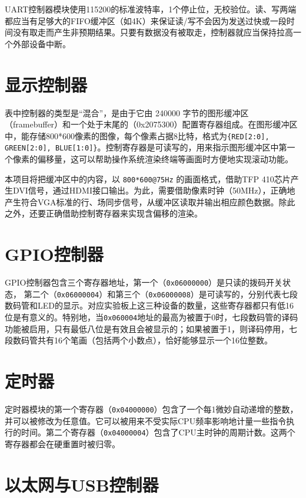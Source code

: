 UART控制器模块使用115200的标准波特率，1个停止位，无校验位。读、写两端都应当有足够大的FIFO缓冲区（如4K）来保证读/写不会因为发送过快或一段时间没有取走而产生非预期结果。只要有数据没有被取走，控制器就应当保持拉高一个外部设备中断。

\section{显示控制器}

表中控制器的类型是“混合”，是由于它由 240000 字节的图形缓冲区（framebuffer）和一个处于末尾的（0x2075300）配置寄存器组成。在图形缓冲区中，能存储800*600像素的图像，每个像素占据8比特，格式为\texttt{\{RED[2:0], GREEN[2:0], BLUE[1:0]\}}。控制寄存器是可读写的，用来指示图形缓冲区中第一个像素的偏移量，这可以帮助操作系统渲染终端等画面时方便地实现滚动功能。

本项目将把缓冲区中的内容，以 \texttt{800*600@75Hz} 的画面格式，借助TFP 410芯片产生DVI信号，通过HDMI接口输出。为此，需要借助像素时钟（50MHz），正确地产生符合VGA标准的行、场同步信号，从缓冲区读取并输出相应颜色数据。除此之外，还要正确借助控制寄存器来实现含偏移的渲染。

\section{GPIO控制器}

GPIO控制器包含三个寄存器地址，第一个（\texttt{0x06000000}）是只读的拨码开关状态， 第二个（\texttt{0x06000004}）和第三个（\texttt{0x06000008}）是可读写的，分别代表七段数码管和LED的显示。对应实验板上这三种设备的数量，这些寄存器都只有低16位是有意义的。特别地，当\texttt{0x060004}地址的最高为被置于0时，七段数码管的译码功能被启用，只有最低八位是有效且会被显示的；如果被置于1，则译码停用，七段数码管共有16个笔画（包括两个小数点），恰好能够显示一个16位整数。

\section{定时器}

定时器模块的第一个寄存器（\texttt{0x04000000}）包含了一个每1微妙自动递增的整数，并可以被修改为任意值。它可以被用来不受实际CPU频率影响地计量一些指令执行的时间。第二个寄存器（\texttt{0x04000004}）包含了CPU主时钟的周期计数。这两个寄存器都会在硬重置时被归零。

\section{以太网与USB控制器}

